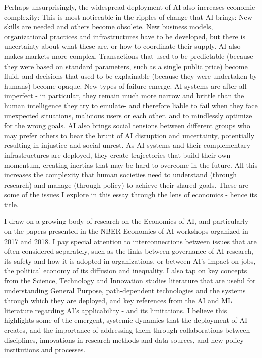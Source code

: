\documentclass[11pt]{article}
\begin{document}
Perhaps unsurprisingly, the widespread deployment of AI also increases economic complexity: This is most noticeable in the ripples of change that AI brings: New skills are needed and others become obsolete. New business models, organizational practices and infrastructures have to be developed, but there is uncertainty about what these are, or how to coordinate their supply. AI also makes markets more complex. Transactions that used to be predictable (because they were based on standard parameters, such as a single public price) become fluid, and decisions that used to be explainable (because they were undertaken by humans) become opaque. New types of failure emerge.  AI systems are after all imperfect - in particular, they remain much more narrow and brittle than the human intelligence they try to emulate- and therefore liable to fail when they face unexpected situations, malicious users or each other, and to mindlessly optimize for the wrong goals. AI also brings social tensions between different groups who may prefer others to bear the brunt of AI disruption and uncertainty, potentially resulting in injustice and social unrest. As AI systems and their complementary infrastructures are deployed, they create trajectories that build their own momentum, creating inertias that may be hard to overcome in the future. All this increases the complexity that human societies need to understand (through research) and manage (through policy) to achieve their shared goals. These are some of the issues I explore in this essay through the lens of economics - hence its title.  

I draw on a growing body of research on the Economics of AI, and particularly on the papers presented in the NBER Economics of AI workshops organized in 2017 and 2018. I pay special attention to  interconnections between issues that are often considered separately, such as the links between governance of AI research, its safety and how it is adopted in organizations, or between AI's impact on jobs,  the political economy of its diffusion and inequality. I also tap on key concepts from the Science, Technology and Innovation studies literature that are useful for understanding General Purpose, path-dependent technologies and the systems through which they are deployed, and key references from the AI and ML literature regarding AI's applicability - and its limitations. I believe this highlights some of the emergent, systemic dynamics that the deployment of AI creates, and the importance of addressing them through collaborations between disciplines, innovations in research methods and data sources, and new policy institutions and processes. 
\end{document}

